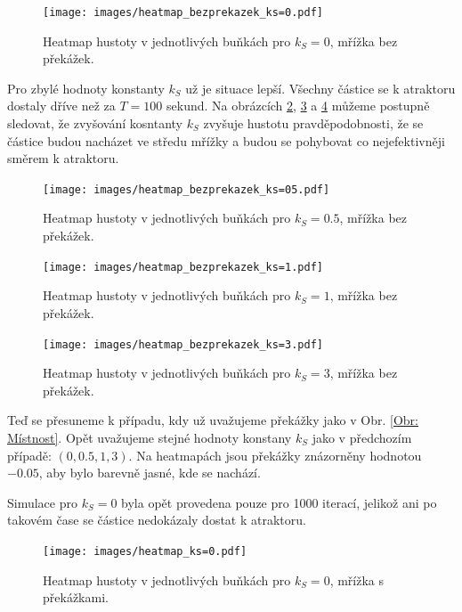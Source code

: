 \documentclass[a4paper, 12pt, fleqn]{article}
\begin{document}
	\begin{figure}
		\centering
		\texttt{[image: images/heatmap\_bezprekazek\_ks=0.pdf]}
		\caption{Heatmap hustoty v jednotlivých buňkách pro $k_S = 0$, mřížka bez překážek.}
		\label{Obr: Heatmap bez ks=0}
	\end{figure}
	
	Pro zbylé hodnoty konstanty $k_S$ už je situace lepší. Všechny částice se k atraktoru dostaly dříve než za $T = 100$ sekund. Na obrázcích \ref{Obr: Heatmap bez ks=0.5}, \ref{Obr: Heatmap bez ks=1} a \ref{Obr: Heatmap bez ks=3} můžeme postupně sledovat, že zvyšování kosntanty $k_S$ zvyšuje hustotu pravděpodobnosti, že se částice budou nacházet ve středu mřížky a budou se pohybovat co nejefektivněji směrem k atraktoru.
	
	\begin{figure}
		\centering
		\texttt{[image: images/heatmap\_bezprekazek\_ks=05.pdf]}
		\caption{Heatmap hustoty v jednotlivých buňkách pro $k_S = 0.5$, mřížka bez překážek.}
		\label{Obr: Heatmap bez ks=0.5}
	\end{figure}
	
	\begin{figure}
		\centering
		\texttt{[image: images/heatmap\_bezprekazek\_ks=1.pdf]}
		\caption{Heatmap hustoty v jednotlivých buňkách pro $k_S = 1$, mřížka bez překážek.}
		\label{Obr: Heatmap bez ks=1}
	\end{figure}
	
	\begin{figure}
		\centering
		\texttt{[image: images/heatmap\_bezprekazek\_ks=3.pdf]}
		\caption{Heatmap hustoty v jednotlivých buňkách pro $k_S = 3$, mřížka bez překážek.}
		\label{Obr: Heatmap bez ks=3}
	\end{figure}
	
	Teď se přesuneme k případu, kdy už uvažujeme překážky jako v Obr. \ref{Obr: Místnost}. Opět uvažujeme stejné hodnoty konstany $k_S$ jako v předchozím případě: $(0,0.5,1,3)$. Na heatmapách jsou překážky znázorněny hodnotou $-0.05$, aby bylo barevně jasné, kde se nachází.
	
	Simulace pro $k_S = 0$ byla opět provedena pouze pro 1000 iterací, jelikož ani po takovém čase se částice nedokázaly dostat k atraktoru.
	
	\begin{figure}
		\centering
		\texttt{[image: images/heatmap\_ks=0.pdf]}
		\caption{Heatmap hustoty v jednotlivých buňkách pro $k_S = 0$, mřížka s překážkami.}
		\label{Obr: Heatmap ks=0}
	\end{figure}
	
\end{document}
